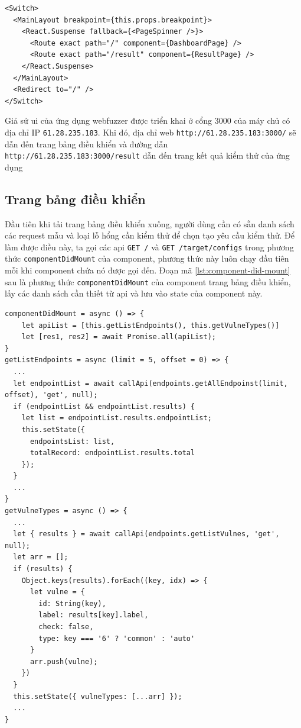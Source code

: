 \begin{lstlisting}[style=ES6, label={lst:routing-at-ui}, caption={Điều hướng các trang web trên \acrshort{ui} của webfuzzer}]
<Switch>
  <MainLayout breakpoint={this.props.breakpoint}>
    <React.Suspense fallback={<PageSpinner />}>
      <Route exact path="/" component={DashboardPage} />
      <Route exact path="/result" component={ResultPage} />
    </React.Suspense>
  </MainLayout>
  <Redirect to="/" />
</Switch>
\end{lstlisting}
Giả sử \acrshort{ui} của ứng dụng webfuzzer được triển khai ở cổng 3000 của máy chủ có địa chỉ IP \texttt{61.28.235.183}. Khi đó, địa chỉ web \texttt{http://61.28.235.183:3000/} sẽ dẫn đến trang bảng điều khiển và đường dẫn \texttt{http://61.28.235.183:3000/result} dẫn đến trang kết quả kiểm thử của ứng dụng
\subsection{Trang bảng điều khiển}
Đầu tiên khi tải trang bảng điều khiển xuống, người dùng cần có sẵn danh sách các request mẫu và loại lỗ hổng cần kiểm thử để chọn tạo yêu cầu kiểm thử. Để làm được điều này, ta gọi các \acrshort{api} \colorbox{gray!30}{\texttt{GET /}} và \colorbox{gray!30}{\texttt{GET /target/configs}} trong phương thức \texttt{componentDidMount} của component, phương thức này luôn chạy đầu tiên mỗi khi component chứa nó được gọi đến. Đoạn mã \ref{lst:component-did-mount} sau là phương thức \texttt{componentDidMount} của component trang bảng điều khiển, lấy các danh sách cần thiết từ \acrshort{api} và lưu vào state của component này.
\begin{lstlisting}[style=ES6, label={lst:component-did-mount}, caption={Hiện thực các thành phần của trang bảng điều khiển}]
componentDidMount = async () => {
	let apiList = [this.getListEndpoints(), this.getVulneTypes()]
	let [res1, res2] = await Promise.all(apiList);
}
getListEndpoints = async (limit = 5, offset = 0) => {
  ...
  let endpointList = await callApi(endpoints.getAllEndpoinst(limit, offset), 'get', null);
  if (endpointList && endpointList.results) {
    let list = endpointList.results.endpointList;
    this.setState({
      endpointsList: list,
      totalRecord: endpointList.results.total
    });
  }
  ...
}
getVulneTypes = async () => {
  ...
  let { results } = await callApi(endpoints.getListVulnes, 'get', null);
  let arr = [];
  if (results) {
    Object.keys(results).forEach((key, idx) => {
      let vulne = {
        id: String(key),
        label: results[key].label,
        check: false,
        type: key === '6' ? 'common' : 'auto'
      }
      arr.push(vulne);
    })
  }
  this.setState({ vulneTypes: [...arr] });
  ...
}
\end{lstlisting}
